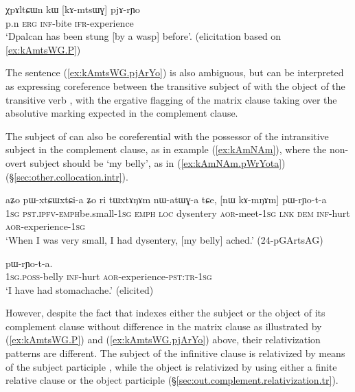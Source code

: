\begin{exe}
\ex   \label{ex:kAmtsWG.pjArYo} 
\gll χpɤltɕɯn kɯ [kɤ-mtsɯɣ]  pjɤ-rɲo  \\
 p.n \textsc{erg} \textsc{inf}-bite \textsc{ifr}-experience \\
\glt `Dpalcan has been stung [by a wasp] before'. (elicitation based on \ref{ex:kAmtsWG.P})
\end{exe} 

The sentence (\ref{ex:kAmtsWG.pjArYo}) is also ambiguous, but can be interpreted as expressing coreference between the transitive subject of  with the object of the transitive verb , with the ergative flagging of the matrix clause taking over the absolutive marking expected in the complement clause.


The subject of  can also be coreferential with the possessor of the intransitive subject in the complement clause, as in example (\ref{ex:kAmNAm}), where the non-overt subject should be  `my belly', as in (\ref{ex:kAmNAm.pWrYota}) (§\ref{sec:other.collocation.intr}).
 
 \begin{exe}
\ex \label{ex:kAmNAm}
\gll aʑo pɯ-xtɕɯ\redp{}xtɕi-a ʑo ri tɯxtɤŋɤm nɯ-atɯɣ-a tɕe, [nɯ kɤ-mŋɤm] pɯ-rɲo-t-a \\
\textsc{1sg} \textsc{pst}.\textsc{ipfv}-\textsc{emph}\redp{}be.small-\textsc{1sg} \textsc{emph} \textsc{loc} dysentery \textsc{aor}-meet-\textsc{1sg} \textsc{lnk} \textsc{dem} \textsc{inf}-hurt \textsc{aor}-experience-\textsc{1sg} \\
\glt `When I was very small, I had dysentery, [my belly] ached.'  (24-pGArtsAG)
\end{exe}

\begin{exe} 
\ex \label{ex:kAmNAm.pWrYota}
 pɯ-rɲo-t-a. \\
\textsc{1sg}.\textsc{poss}-belly \textsc{inf}-hurt \textsc{aor}-experience-\textsc{pst}:\textsc{tr}-\textsc{1sg} \\
\glt `I have had stomachache.' (elicited)
\end{exe} 

However, despite the fact that  indexes either the subject or the object of its complement clause without difference in the matrix clause as illustrated by (\ref{ex:kAmtsWG.P}) and (\ref{ex:kAmtsWG.pjArYo}) above, their relativization patterns are different. The subject of the infinitive clause is relativized by means of the subject participle , while the object is relativized by using either a finite relative clause or the object participle  (§\ref{sec:out.complement.relativization.tr}). 

